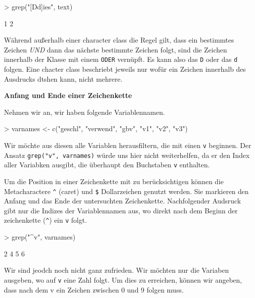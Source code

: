 \documentclass[a4paper]{report}
\begin{document}
\begin{Schunk}
\begin{Sinput}
> grep("[Dd]ies", text)   
\end{Sinput}
\begin{Soutput}
[1] 1 2
\end{Soutput}
\end{Schunk}

Während außerhalb einer character class die Regel gilt, dass ein bestimmtes Zeichen \emph{UND} dann das nächste bestimmte Zeichen folgt, sind die Zeichen innerhalb der Klasse mit einem \texttt{ODER} vernüpft. Es kann also das \texttt{D} oder das \texttt{d} folgen. Eine chacter class beschriebt jeweils nur wofür ein Zeichen innerhalb des Ausdrucks dtshen kann, nicht mehrere. 



\textbf{Anfang und Ende einer Zeichenkette}

Nehmen wir an, wir haben folgende Variablennamen.

\begin{Schunk}
\begin{Sinput}
> varnames <- c("geschl", "verwend", "gbv", "v1", "v2", "v3")
\end{Sinput}
\end{Schunk}

Wir möchte aus diesen alle Variablen herausfiltern, die mit einen \texttt{v} beginnen. Der Ansatz \texttt{grep("v", varnames)} würde uns hier nicht weiterhelfen, da er den Index aller Variabken ausgibt, die überhaupt den Buchstaben \texttt{v} enthalten.

Um die Position in einer Zeichenkette mit zu berücksichtigen können die Metacharactere \verb!^! (caret) und \verb!$! Dollarzeichen genutzt werden. Sie markieren den Anfang und das Ende der untersuchten Zeichenkette. Nachfolgender Audsruck gibt nur die Indizes der Variablennamen aus, wo direkt nach dem Beginn der zeichenkette (\verb!^!) ein \texttt{v} folgt.

\begin{Schunk}
\begin{Sinput}
> grep("^v", varnames)
\end{Sinput}
\begin{Soutput}
[1] 2 4 5 6
\end{Soutput}
\end{Schunk}

Wir sind jeodch noch nicht ganz zufrieden. Wir möchten nur die Variaben ausgeben, wo auf \texttt{v} eine Zahl folgt. Um dies zu erreichen, können wir angeben, dass nach dem v ein Zeichen zwischen 0 und 9 folgen muss. 
\end{document}
